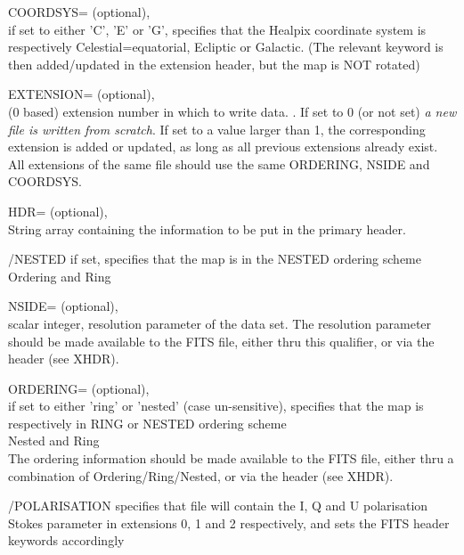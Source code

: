 \begin{keywords}
  \begin{kwlist}{} %
       \item[{COORDSYS=}]
		  (optional), \\
		if set to either 'C', 'E' or 'G',  specifies that the
		Healpix coordinate system is respectively Celestial=equatorial,
		  Ecliptic or Galactic.
		(The relevant keyword is then added/updated in the extension
		  header, but the map is NOT rotated)

	\item[{EXTENSION=}]
		  (optional), \\
	  (0 based) extension number in which to write data. .
	  If set to 0 (or not set) {\em a new file is written from scratch}.
	  If set to a value
		  larger than 1, the corresponding extension is added or
		  updated, as long as all previous extensions already exist.
		  All extensions of the same file should use the same ORDERING,
		  NSIDE and COORDSYS.

    	\item[HDR=] 	
		(optional), \\
		String array containing the information to be put in
		the primary header. 

	\item[{/NESTED}] if set, specifies that the map is in the NESTED ordering
	scheme\\
	\seealso Ordering and Ring 

	\item[{NSIDE=}] 
		(optional), \\
		scalar integer, \healpix resolution parameter of the
		data set. The resolution parameter should be made
		available to the FITS file, either thru this
		qualifier, or via the header (see XHDR).

	\item[{ORDERING=}]
		  (optional), \\
		if set to either 'ring' or 'nested' (case un-sensitive),
		  specifies that the map is respectively in RING or NESTED
		  ordering scheme\\
		\seealso Nested and Ring \\
	The ordering information should be made
		available to the FITS file, either thru a combination
		  of Ordering/Ring/Nested, or via the header (see XHDR).

	\item[{/POLARISATION}]
	  specifies that file will contain the I, Q and U polarisation
           Stokes parameter in extensions 0, 1 and 2 respectively, and sets the
FITS header keywords accordingly


\end{kwlist}
\end{keywords}
